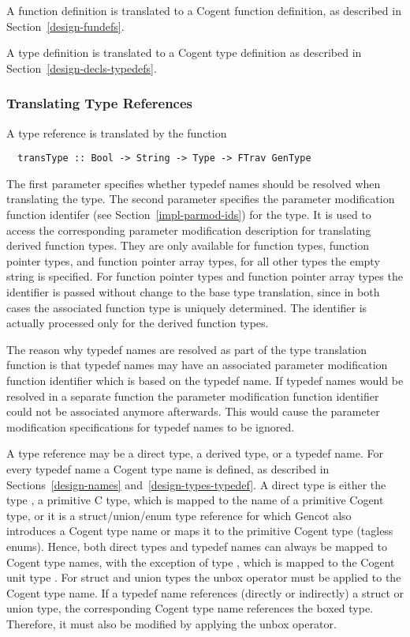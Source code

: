 A function definition is translated to a Cogent function definition, as described in Section~\ref{design-fundefs}.

A type definition is translated to a Cogent type definition as described in Section~\ref{design-decls-typedefs}.

\subsubsection{Translating Type References}

A type reference is translated by the function
\begin{verbatim}
  transType :: Bool -> String -> Type -> FTrav GenType
\end{verbatim}

The first parameter specifies whether typedef names should be resolved when translating the type. The second parameter 
specifies  the parameter modification function identifer (see Section~\ref{impl-parmod-ids}) for the type. It is used to
access the corresponding parameter modification description for translating derived function types. They are only available
for function types, function pointer types, and function pointer array types, for all other types the empty string is 
specified. For function pointer types and function pointer array types the identifier is passed without change to the 
base type translation, since in both cases the associated function type is uniquely determined. The identifier is 
actually processed only for the derived function types.

The reason why typedef names are resolved as part of the type translation function is that typedef names may have
an associated parameter modification function identifier which is based on the typedef name. If typedef names would
be resolved in a separate function the parameter modification function identifier could not be associated anymore
afterwards. This would cause the parameter modification specifications for typedef names to be ignored.

A type reference may be a direct type, a derived type, or a typedef name. For every typedef name a Cogent type
name is defined, as described in Sections~\ref{design-names} and~\ref{design-types-typedef}. A direct type is either
the type , a primitive C type, which is mapped to the name of a primitive Cogent type, or it is a 
struct/union/enum type reference for which Gencot also introduces a Cogent type name or maps it to the 
primitive Cogent type  (tagless enums). Hence, both direct types and typedef names can always be mapped
to Cogent type names, with the exception of type , which is mapped to the Cogent unit type \code{()}.
For struct and union types the unbox operator must be applied to the Cogent type name.
If a typedef name references (directly or indirectly) a struct or union type, the corresponding Cogent
type name references the boxed type. Therefore, it must also be modified by applying the unbox operator. 

